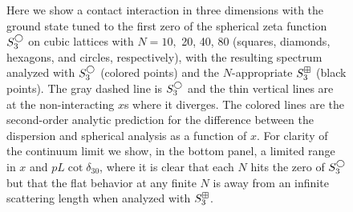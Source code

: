 \begin{figure}[htb]
    \scalebox{0.8}{}
    \caption{
        Here we show a contact interaction in three dimensions with the ground state tuned to the first zero of the spherical zeta function $S^{\bigcirc}_3$ on cubic lattices with $N=10,$ 20, 40, 80 (squares, diamonds, hexagons, and circles, respectively), with the resulting spectrum analyzed with $S^{\bigcirc}_3$ (colored points) and the $N$-appropriate $S^{\boxplus}_3$ (black points).
        The gray dashed line is $S^\bigcirc_3$ and the thin vertical lines are at the non-interacting $x$s where it diverges.
        The colored lines are the second-order analytic prediction for the difference between the dispersion and spherical analysis as a function of $x$.
        For clarity of the continuum limit we show, in the bottom panel, a limited range in $x$ and $pL\cot\delta_{30}$, where it is clear that each $N$ hits the zero of $S^\bigcirc_3$ but that the flat behavior at any finite $N$ is away from an infinite scattering length when analyzed with $S^\boxplus_3$.
    }
    \label{fig:3d-corrections}
\end{figure}

